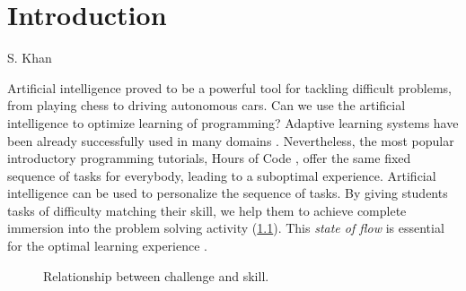 \chapter{Introduction}
\label{chap:introduction}


{S. Khan}

Artificial intelligence proved to be a powerful tool for tackling difficult problems,
from playing chess to driving autonomous cars. %
Can we use the artificial intelligence to optimize learning of programming?
Adaptive learning systems have been already successfully used in many domains
\cite{alg.evaluation-geography,
matmat.response-times, mathsgarden, sqltutor}.
Nevertheless, the most popular introductory programming tutorials,
Hours of Code \cite{hour-of-code},
offer the same fixed sequence of tasks for everybody,
leading to a suboptimal experience.
Artificial intelligence can be used to personalize the sequence of tasks.
By giving students tasks of difficulty matching their skill,
we help them to achieve complete immersion into the problem solving
activity (\cref{fig:flow}).
This \emph{state of flow} \cite{flow}
is essential for the optimal learning experience
\cite{adaptive-practice}.

\begin{figure}[htb]
  \centering
  \caption{Relationship between challenge and skill.}
  \label{fig:flow}
\end{figure}

